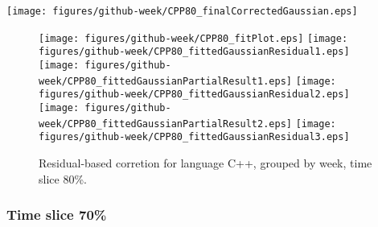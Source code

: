 \begin{center}
{\texttt{[image: figures/github-week/CPP80\_finalCorrectedGaussian.eps]}}
\end{center}

\FloatBarrier

\begin{figure}[t]
\centering
{}
{\texttt{[image: figures/github-week/CPP80\_fitPlot.eps]}}
{\texttt{[image: figures/github-week/CPP80\_fittedGaussianResidual1.eps]}}
{\texttt{[image: figures/github-week/CPP80\_fittedGaussianPartialResult1.eps]}}
{\texttt{[image: figures/github-week/CPP80\_fittedGaussianResidual2.eps]}}
{\texttt{[image: figures/github-week/CPP80\_fittedGaussianPartialResult2.eps]}}
{\texttt{[image: figures/github-week/CPP80\_fittedGaussianResidual3.eps]}}
\caption{Residual-based corretion for language C++, grouped by week, time slice 80\%.}
\end{figure}


\FloatBarrier


\subsubsection{Time slice 70\%}

